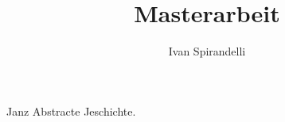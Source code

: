 \documentclass[a4paper, 11pt,openany,oneside]{scrbook}
\title{Masterarbeit}
\author{Ivan Spirandelli}
\theoremstyle{definition}
\theoremstyle{plain}
\newenvironment{abstract}{\cleardoublepage \null \vfill \begin{center} \bfseries \abstractname \end{center}}{\vfill \null}
\begin{document}


\newpage
\thispagestyle{empty}
\qquad
\begin{abstract}
Janz Abstracte  Jeschichte.
\end{abstract}
\newpage
\thispagestyle{empty}
\qquad

\tableofcontents
\newpage
\thispagestyle{empty}
\qquad


\newpage

\qquad
%
\newpage

\qquad
%






\newpage
\backmatter


\end{document}
